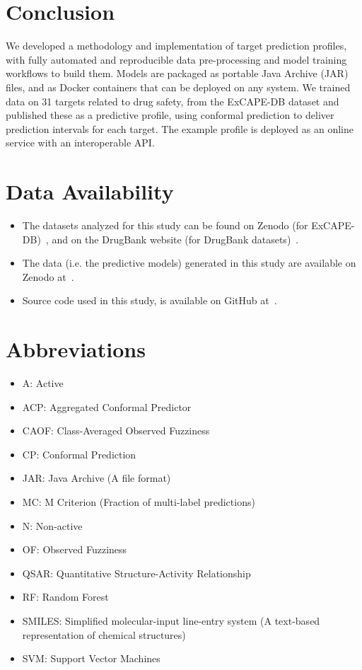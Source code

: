 \documentclass[utf8]{frontiersSCNS} %
\begin{document}
\section{Conclusion} \label{Conclusion}
We developed a methodology and implementation of target prediction profiles,
with fully automated and reproducible data pre-processing and model training
workflows to build them. Models are packaged as portable Java Archive (JAR)
files, and as Docker containers that can be deployed on any system. We trained
data on 31 targets related to drug safety, from the ExCAPE-DB dataset and published
these as a predictive profile, using conformal prediction to deliver prediction
intervals for each target. The example profile is deployed as an online service
with an interoperable API.



\section{Data Availability} \label{Data Availability}

\begin{itemize}
    \item The datasets analyzed for this study can be found on Zenodo (for
        ExCAPE-DB)~\cite{ExcapeDBZenodo}, and on the DrugBank website (for
        DrugBank datasets)~\cite{DrugBankWebsite}.
    \item The data (i.e. the predictive models) generated in this study are
        available on Zenodo at~\cite{ModelsZenodo}.
    \item Source code used in this study, is available on GitHub
        at~\cite{PTPGitHub}.
\end{itemize}

\newpage

\section{Abbreviations} \label{Abbreviations}

\begin{itemize}
    \item A: Active
    \item ACP: Aggregated Conformal Predictor
    \item CAOF: Class-Averaged Observed Fuzziness
    \item CP: Conformal Prediction
    \item JAR: Java Archive (A file format)
    \item MC: M Criterion (Fraction of multi-label predictions)
    \item N: Non-active
    \item OF: Observed Fuzziness
    \item QSAR: Quantitative Structure-Activity Relationship
    \item RF: Random Forest
    \item SMILES: Simplified molecular-input line-entry system (A text-based representation of chemical structures)
    \item SVM: Support Vector Machines
\end{itemize}
\end{document}
